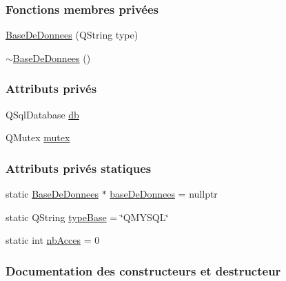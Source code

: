 \subsubsection*{Fonctions membres privées}
\begin{DoxyCompactItemize}
\item 
\hyperlink{class_base_de_donnees_a10dd177f1008f675ab78c2221b2a6750}{Base\+De\+Donnees} (Q\+String type)
\item 
\hyperlink{class_base_de_donnees_a5dc474cdbe003644fb0ca7b8f2ec6b93}{$\sim$\+Base\+De\+Donnees} ()
\end{DoxyCompactItemize}
\subsubsection*{Attributs privés}
\begin{DoxyCompactItemize}
\item 
Q\+Sql\+Database \hyperlink{class_base_de_donnees_a3e738dcf443370c46a541677ab619f06}{db}
\item 
Q\+Mutex \hyperlink{class_base_de_donnees_aa1b4696fac87a740f914aa73739086f2}{mutex}
\end{DoxyCompactItemize}
\subsubsection*{Attributs privés statiques}
\begin{DoxyCompactItemize}
\item 
static \hyperlink{class_base_de_donnees}{Base\+De\+Donnees} $\ast$ \hyperlink{class_base_de_donnees_a822ba0b7cf85b1e48ced8efd3d65e266}{base\+De\+Donnees} = nullptr
\item 
static Q\+String \hyperlink{class_base_de_donnees_ab682b82167f494496a6531bfe522b42b}{type\+Base} = \char`\"{}Q\+M\+Y\+S\+QL\char`\"{}
\item 
static int \hyperlink{class_base_de_donnees_a5099ecb2922bb31d84cd5d4505298a29}{nb\+Acces} = 0
\end{DoxyCompactItemize}


\subsubsection{Documentation des constructeurs et destructeur}
\mbox{\label{class_base_de_donnees_a10dd177f1008f675ab78c2221b2a6750}} 
